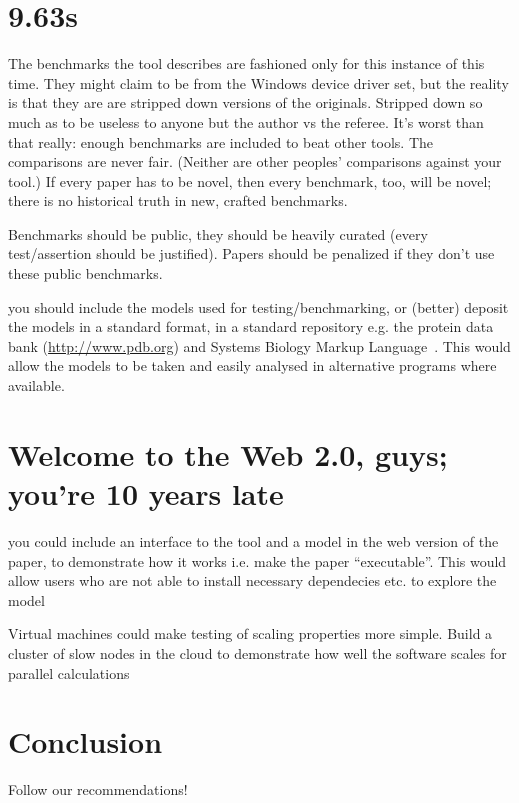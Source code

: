 \documentclass[conference]{IEEEtran}
\begin{document}
\section{9.63s} 

The benchmarks the tool describes are fashioned only for this instance
of this time. They might claim to be from the Windows device driver
set, but the reality is that they are are stripped down versions of
the originals. Stripped down so much as to be useless to anyone but
the author vs the referee. It's worst than that really: enough
benchmarks are included to beat other tools. The comparisons are never
fair. (Neither are other peoples' comparisons against your tool.) If
every paper has to be novel, then every benchmark, too, will be novel;
there is no historical truth in new, crafted benchmarks.


Benchmarks should be public, they should be heavily curated (every
test/assertion should be justified). Papers should be penalized if
they don't use these public benchmarks.

you should include the models used for testing/benchmarking, or
(better) deposit the models in a standard format, in a standard
repository e.g. the protein data bank (\url{http://www.pdb.org}) and
Systems Biology Markup Language~\cite{Hucka2003,Chaouiya2013}. This
would allow the models to be taken and easily analysed in alternative
programs where available.

\section{Welcome to the Web 2.0, guys; you're 10 years late} 

you could include an interface to the tool and a model in the web
version of the paper, to demonstrate how it works i.e. make the paper
``executable''. This would allow users who are not able to install
necessary dependecies etc. to explore the model \cite{Hall2014}

Virtual machines could make testing of scaling properties more simple. 
Build a cluster of slow nodes in the cloud to demonstrate how well the
software scales for parallel calculations


\section{Conclusion}
Follow our recommendations!




\end{document}
